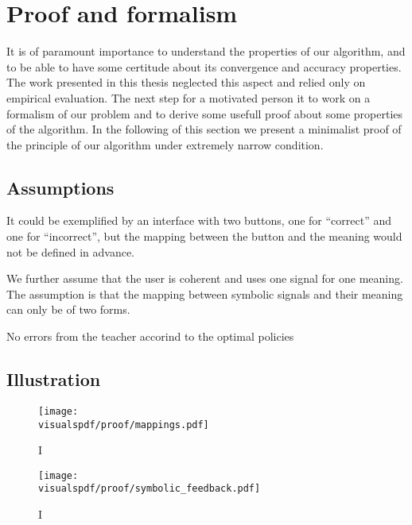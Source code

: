 
\section{Proof and formalism}
\label{chapter:limitations:proof}

It is of paramount importance to understand the properties of our algorithm, and to be able to have some certitude about its convergence and accuracy properties. The work presented in this thesis neglected this aspect and relied only on empirical evaluation. The next step for a motivated person it to work on a formalism of our problem and to derive some usefull proof about some properties of the algorithm. In the following of this section we present a minimalist proof of the principle of our algorithm under extremely narrow condition.


\subsection{Assumptions}

It could be exemplified by an interface with two buttons, one for ``correct'' and one for ``incorrect'', but the mapping between the button and the meaning would not be defined in advance.

We further assume that the user is coherent and uses one signal for one meaning. The assumption is that the mapping between symbolic signals and their meaning can only be of two forms.

No errors from the teacher accorind to the optimal policies




\subsection{Illustration}


\begin{figure}[!ht]
\centering
\texttt{[image: \\visualspdf/proof/mappings.pdf]}
\caption{I}
\label{fig:proofmapping}
\end{figure} 


\begin{figure}[!ht]
\centering
\texttt{[image: \\visualspdf/proof/symbolic\_feedback.pdf]}
\caption{I}
\label{fig:proofsymbolic}
\end{figure} 




